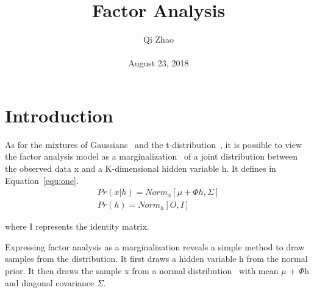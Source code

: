 \documentclass[10pt,twocolumn,letterpaper]{article}
\begin{document}
\title{Factor Analysis}
\author{Qi Zhao\\\\August 23, 2018}

\maketitle
\section{Introduction}
 As for the mixtures of Gaussians~\cite{Dasgupta1999Learning} and the t-distribution~\cite{Hartley1950Table}, it is possible to view the factor analysis model as a marginalization~\cite{Calabrese1999The} of a joint distribution between the observed data x and a K-dimensional hidden variable h. It defines in Equation~\ref{equ:one}.
\begin{equation}
\begin{split}
Pr(x|h) = Norm_x[\mu + \Phi h, \Sigma]\\
 Pr(h) = Norm_h[O, I]
\end{split}
\label{equ:one}
\end{equation}

where I represents the identity matrix.

Expressing factor analysis as a marginalization reveals a simple method to draw samples from the distribution. It first draws a hidden variable h from the normal prior. It then draws the sample x from a normal distribution~\cite{Hoeffding1948A} with mean $\mu$ + $\Phi$h and diagonal covariance $\Sigma$.
\end{document}
